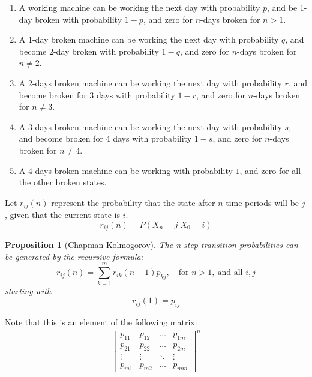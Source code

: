 \documentclass[aspectratio=169]{beamer}
\newtheorem{proposition}{Proposition}[section]
\begin{document}
\begin{frame}
    \begin{enumerate}
        \item A working machine can be working the next day with probability $p$, and be 1-day broken with probability $1-p$, and zero for $n$-days broken for $n>1$.
        \item A 1-day broken machine can be working the next day with probability $q$, and become 2-day broken with probability $1-q$, and zero for $n$-days broken for $n\neq2$.
        \item A 2-days broken machine can be working the next day with probability $r$, and become broken for 3 days with probability $1-r$, and zero for $n$-days broken for $n\neq3$.
        \item A 3-days broken machine can be working the next day with probability $s$, and become broken for 4 days with probability $1-s$, and zero for $n$-days broken for $n\neq4$.
        \item A 4-days broken machine can be working with probability $1$, and zero for all the other broken states.
    \end{enumerate}

\end{frame}

\begin{frame}
    \begin{definition}
        Let $r_{ij}(n)$ represent the probability that the state after $n$ time periods will be $j$, given that the current state is $i$.
        \[r_{ij}(n)=P(X_n=j|X_0=i)\]
    \end{definition}
    \begin{proposition}[Chapman-Kolmogorov]
        The n-step transition probabilities can be generated by the recursive formula:
        \[r_{ij}(n)=\sum_{k=1}^m r_{ik}(n-1)p_{kj},\quad \text{for\ }n>1,\ \text{and all }i,j\]
        starting with \[r_{ij}(1)=p_{ij}\]
    \end{proposition}
    
\end{frame}

\begin{frame}
    Note that this is an element of the following matrix:
    \begin{align*}
        \begin{bmatrix}
            p_{11}&p_{12}&\hdots&p_{1m}\\
            p_{21}&p_{22}&\hdots&p_{2m}\\
            \vdots&\vdots &\ddots & \vdots\\
            p_{m1}&p_{m2}&\hdots&p_{mm}
        \end{bmatrix}^n
    \end{align*}
\end{frame}
\end{document}

